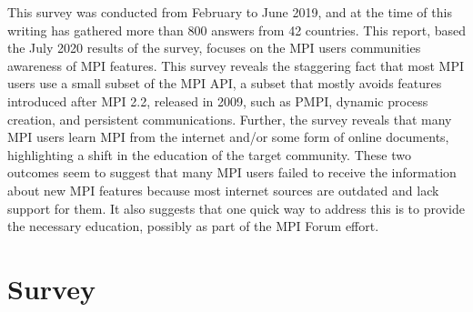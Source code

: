 \documentclass[sigconf,nonacm]{acmart}
\begin{document}
This survey was conducted from February to June 2019, and at the time of
this writing has gathered more than 800 answers from 42 countries.
%
This report, based the July 2020 results of the survey,
focuses on the MPI users communities awareness of MPI features.
%
This survey reveals the staggering fact that most MPI users use a small subset
of the MPI API, a subset that mostly avoids features introduced after MPI 2.2,
released in 2009, such as PMPI, dynamic process creation, and persistent
communications. Further, the survey reveals that many MPI users learn MPI
from the internet and/or some form of online documents, highlighting a shift in
the education of the target community.
%
These two outcomes seem to suggest that many MPI users failed to receive the
information about new MPI features because most internet sources are outdated
and lack support for them. It also suggests that one quick way to address this
is to provide the necessary education, possibly as part of the MPI Forum effort.

\section{Survey}
\end{document}
